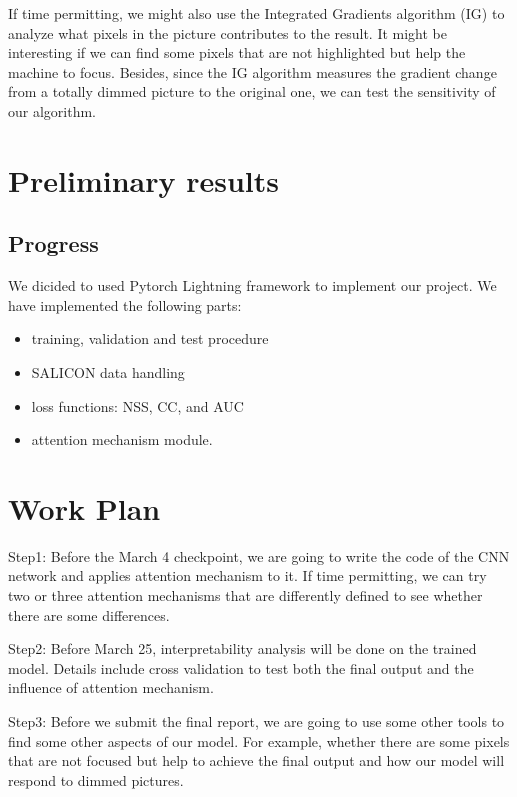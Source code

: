 \documentclass[12pt]{article}
\begin{document}
If time permitting, we might also use the Integrated Gradients algorithm (IG) \cite{sundararajan2017axiomatic} to analyze what pixels in the picture contributes to the result. 
It might be interesting if we can find some pixels that are not highlighted but help the machine to focus. 
Besides, since the IG algorithm measures the gradient change from a totally dimmed picture to the original one, we can test the sensitivity of our algorithm.

\section{Preliminary results}
\subsection{Progress}
We dicided to used Pytorch Lightning framework \cite{falcon2019pytorch} to implement our project.
We have implemented the following parts:
\begin{itemize}
    \item training, validation and test procedure
    \item SALICON data handling
    \item loss functions: NSS, CC, and AUC
    \item attention mechanism module.
\end{itemize}


\section{Work Plan}

Step1: Before the March 4 checkpoint, we are going to write the code of the CNN network and applies attention mechanism to it. 
If time permitting, we can try two or three attention mechanisms that are differently defined to see whether there are some differences. 

Step2: Before March 25, interpretability analysis will be done on the trained model. Details include cross validation to test both the final output and the influence of attention mechanism. 

Step3: Before we submit the final report, we are going to use some other tools to find some other aspects of our model. 
For example, whether there are some pixels that are not focused but help to achieve the final output and how our model will respond to dimmed pictures. 


\newpage



\end{document}
